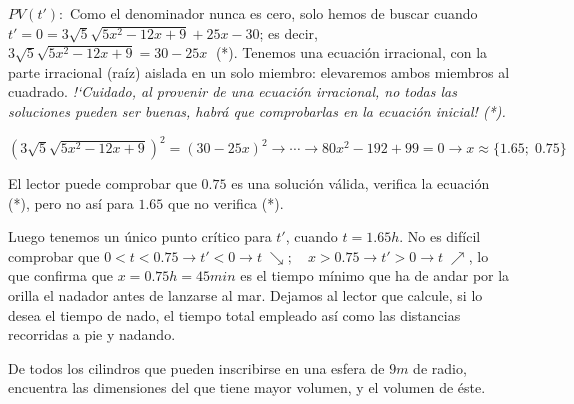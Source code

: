 \begin{proofw}
	$PV(t'):$ Como el denominador nunca es cero, solo hemos de buscar cuando $t'=0=3\sqrt{5}\sqrt{5x^2-12x+9}+25x-30$; es decir, $3\sqrt{5}\sqrt{5x^2-12x+9}=30-25x\; $ (*). Tenemos una ecuación irracional, con la parte irracional (raíz) aislada en un solo miembro: elevaremos ambos miembros al cuadrado. \emph{!`Cuidado, al provenir de una ecuación irracional, no todas las soluciones pueden ser buenas, habrá que comprobarlas en la ecuación inicial! (*).}
	
	$\left( 3\sqrt{5}\sqrt{5x^2-12x+9} \right)^2 =(30-25x)^2 \to \cdots \to 80x^2-192+99=0 \to x \approx \{1.65; \; 0.75\}$
	
	El lector puede comprobar que $0.75$ es una solución válida, verifica la ecuación (*), pero no así para $1.65$ que no verifica (*).
	
	Luego tenemos un único punto crítico para $t'$, cuando $t=1.65h$. No es difícil comprobar que $0<t<0.75 \to t'<0 \to t\; \searrow; \quad x>0.75 \to t'>0 \to t\; \nearrow  $, lo que confirma que $x=0.75h=45min$ es el tiempo mínimo que ha de andar por la orilla el nadador antes de lanzarse al mar. Dejamos al lector que calcule, si lo desea el tiempo de nado, el tiempo total empleado así como las distancias recorridas a pie y nadando.
	
	\end{proofw}
	
	
	
	\begin{ejre}De todos los cilindros que pueden inscribirse en una esfera de $9m$ de radio, encuentra las dimensiones del que tiene mayor volumen, y el volumen de éste.	
	\end{ejre}
	
